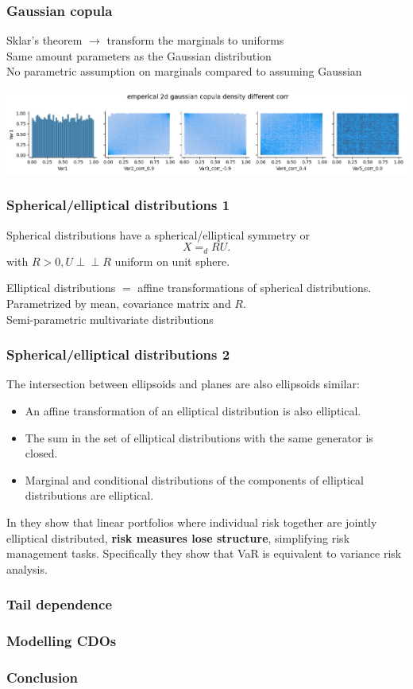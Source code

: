 \documentclass[18pt,aspectratio=149]{beamer}
\begin{document}
\begin{frame}
    \frametitle{Gaussian copula}
    Sklar's theorem $\rightarrow$ transform the marginals to uniforms \\
    Same amount parameters as the Gaussian distribution \\
    No parametric assumption on marginals compared to assuming Gaussian

    \begin{center}
        \includegraphics[width=\textwidth]{gaussian_copula.png}
    \end{center}

\end{frame}


\begin{frame}
    \frametitle{Spherical/elliptical distributions 1}
    Spherical distributions have a spherical/elliptical symmetry or\\
    \begin{equation}
        X =_{d} R U
        .
    \end{equation}
    with $R>0,U\perp\!\!\!\perp R$ uniform on unit sphere. \\
    \pause

    Elliptical distributions $=$ affine transformations of spherical distributions. \\
    \pause
    Parametrized by mean, covariance matrix and $R$. \\
    Semi-parametric multivariate distributions
\end{frame}

\begin{frame}
    \frametitle{Spherical/elliptical distributions 2}
    The intersection between ellipsoids and planes are also ellipsoids similar:
    \pause
    \begin{itemize}
        \item An affine transformation of an elliptical distribution is also elliptical.
        \item The sum in the set of elliptical distributions with the same generator is closed.
        \item Marginal and conditional  distributions of the components of elliptical distributions are elliptical.
    \end{itemize}
    \pause
    \vspace{0.5cm}
    In \cite{dempster_correlation_2002} they show that linear portfolios where individual risk together are jointly elliptical
    distributed, \textbf{risk measures lose structure}, simplifying risk management tasks. Specifically they show that VaR is equivalent
    to variance risk analysis.
\end{frame}

\begin{frame}
    \frametitle{Tail dependence}
\end{frame}

\begin{frame}
    \frametitle{Modelling CDOs}
\end{frame}

\begin{frame}
    \frametitle{Conclusion}
\end{frame}
\end{document}
